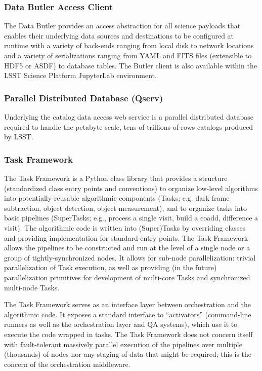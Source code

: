 \documentclass[DM,lsstdraft,toc]{lsstdoc}
\begin{document}
\subsubsection{Data Butler Access
Client}\label{data-butler-access-client}

The Data Butler provides an access abstraction for all science payloads
that enables their underlying data sources and destinations to be
configured at runtime with a variety of back-ends ranging from local
disk to network locations and a variety of serializations ranging from
YAML and FITS files (extensible to HDF5 or ASDF) to database tables. The
Butler client is also available within the LSST Science Platform
JupyterLab environment.

\subsubsection{Parallel Distributed Database
(Qserv)}\label{parallel-distributed-database-qserv}

Underlying the catalog data access web service is a parallel distributed
database required to handle the petabyte-scale,
tens-of-trillions-of-rows catalogs produced by LSST.

\subsubsection{Task Framework}\label{task-framework}

The Task Framework is a Python class library that provides a structure
(standardized class entry points and conventions) to organize low-level
algorithms into potentially-reusable algorithmic components (Tasks; e.g.
dark frame subtraction, object detection, object measurement), and to
organize tasks into basic pipelines (SuperTasks; e.g., process a single
visit, build a coadd, difference a visit). The algorithmic code is
written into (Super)Tasks by overriding classes and providing
implementation for standard entry points. The Task Framework allows the
pipelines to be constructed and run at the level of a single node or a
group of tightly-synchronized nodes. It allows for sub-node
parallelization: trivial parallelization of Task execution, as well as
providing (in the future) parallelization primitives for development of
multi-core Tasks and synchronized multi-node Tasks.

The Task Framework serves as an interface layer between orchestration
and the algorithmic code. It exposes a standard interface to
``activators'' (command-line runners as well as the orchestration layer
and QA systems), which use it to execute the code wrapped in tasks. The
Task Framework does not concern itself with fault-tolerant massively
parallel execution of the pipelines over multiple (thousands) of nodes
nor any staging of data that might be required; this is the concern of
the orchestration middleware.
\end{document}

